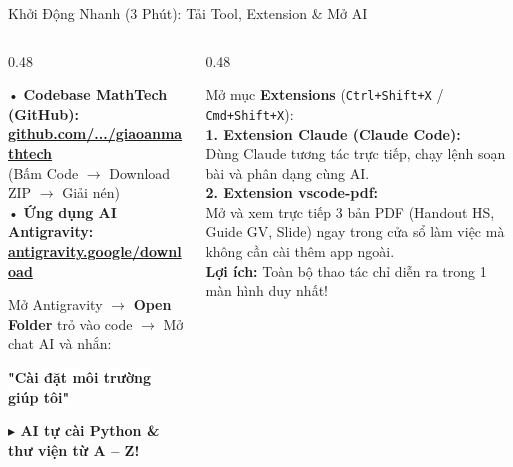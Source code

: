 \documentclass[aspectratio=169,11pt]{beamer}
\begin{document}
\begin{frame}{Khởi Động Nhanh (3 Phút): Tải Tool, Extension \& Mở AI}
  \begin{columns}[T]
    \begin{column}{0.48\textwidth}
      \begin{tcolorbox}[slidecard, top=2pt, bottom=2pt, title=1. Tải Mã Nguồn \& Antigravity]
        \scriptsize
        • \textbf{Codebase MathTech (GitHub):}\\
        \href{https://github.com/icecubesssss/giaoanmathtech}{\textbf{\color{info}github.com/.../giaoanmathtech}}\\
        {\color{muted}(Bấm Code $\to$ Download ZIP $\to$ Giải nén)}\\[3pt]
        • \textbf{Ứng dụng AI Antigravity:}\\
        \href{https://antigravity.google/download}{\textbf{\color{info}antigravity.google/download}}
      \end{tcolorbox}
      \vspace{1pt}
      \begin{tcolorbox}[slidecard, top=2pt, bottom=2pt, title=2. Mở Thư Mục \& Kích Hoạt Môi Trường]
        \scriptsize
        Mở Antigravity $\to$ \textbf{Open Folder} trỏ vào code $\to$ Mở chat AI và nhắn:
        \vspace{1pt}
        \begin{center}
          \colorbox{white}{\color{accent}\bfseries\scriptsize "Cài đặt môi trường giúp tôi"}
        \end{center}
        {\color{success}\textbf{$\blacktriangleright$ AI tự cài Python \& thư viện từ A – Z!}}
      \end{tcolorbox}
    \end{column}

    \begin{column}{0.48\textwidth}
      \begin{tcolorbox}[accentcard, top=3pt, bottom=3pt, title=3. Cài 2 Extension Thiết Yếu (Trong VS Code)]
        \scriptsize
        Mở mục \textbf{Extensions} (\texttt{Ctrl+Shift+X} / \texttt{Cmd+Shift+X}):\\[2pt]
        \textbf{1. Extension Claude (Claude Code):}\\
        Dùng Claude tương tác trực tiếp, chạy lệnh soạn bài và phân dạng cùng AI.\\[4pt]
        \textbf{2. Extension vscode-pdf:}\\
        Mở và xem trực tiếp 3 bản PDF (Handout HS, Guide GV, Slide) ngay trong cửa sổ làm việc mà không cần cài thêm app ngoài.\\[4pt]
        {\color{brand}\textbf{Lợi ích:}} Toàn bộ thao tác chỉ diễn ra trong 1 màn hình duy nhất!
      \end{tcolorbox}
    \end{column}
  \end{columns}
\end{frame}
\end{document}
